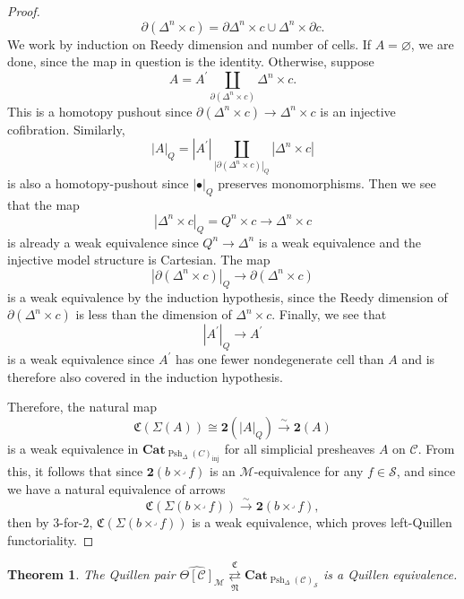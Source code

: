 \documentclass[leqno]{article}
\numberwithin{equation}{subsection}
\theoremstyle{plain}   %
\newtheorem{thm}[equation]{Theorem}
\theoremstyle{remark}
\theoremstyle{plain}
\DeclareMathOperator{\Psh}{Psh}
\newcommand{\Cat}{\ensuremath{\mathbf{Cat}}}
\newcommand{\realiz}[1]{\ensuremath{\left\lvert#1\right\rvert}}
\providecommand{\C}{}
\renewcommand{\C}{\ensuremath{\mathcal{C}}}
\newcommand{\M}{\ensuremath{\mathcal{M}}}
\newcommand{\setS}{\ensuremath{\mathscr{S}}}
\newcommand{\cellset}{\ensuremath{\widehat{\Theta[\mathcal{C}]}}}
\begin{document}
\begin{proof}
  \[\partial(\Delta^n\times c)=\partial\Delta^n \times c \cup \Delta^n \times \partial c.\]
  We work by induction on Reedy dimension and number of cells.
  If \(A=\varnothing\), we are done, since the map in question is the identity.
  Otherwise, suppose
  \[A=A^\prime \coprod_{\partial(\Delta^n\times c)}  \Delta^n\times c.\]
  This is a homotopy pushout since \(\partial(\Delta^n \times c) \to \Delta^n\times c\) is an injective cofibration. Similarly, 
  \[\realiz{A}_Q=\realiz{A^\prime} \coprod_{\realiz{\partial(\Delta^n\times c)}_Q}  \realiz{\Delta^n\times c}\]
  is also a homotopy-pushout since \(\realiz{\bullet}_Q\) preserves monomorphisms.  Then we see that the map 
  \[\realiz{\Delta^n \times c}_Q=Q^n \times c \to \Delta^n\times c\] is already a weak equivalence since \(Q^n\to \Delta^n\) is a weak equivalence and the injective model structure is Cartesian.  The map 
  \[\realiz{\partial(\Delta^n \times c)}_Q \to \partial(\Delta^n \times c)\]
  is a weak equivalence by the induction hypothesis, since the Reedy dimension of \(\partial(\Delta^n \times c)\) is less than the dimension of \(\Delta^n \times c\). Finally, we see that 
  \[\realiz{A^\prime}_Q \to A^\prime\]
  is a weak equivalence since \(A^\prime\) has one fewer nondegenerate cell than \(A\) and is therefore also covered in the induction hypothesis.

  Therefore, the natural map
  \[\mathfrak{C}(\Sigma(A))\cong \mathbf{2}(\realiz{A}_Q) \xrightarrow{\sim} \mathbf{2}(A)\]
  is a weak equivalence in \(\Cat_{\Psh_{\Delta}(C)_{\mathrm{inj}}}\) for all simplicial presheaves \(A\) on \(\C\).
  From this, it follows that since \(\mathbf{2}(b\times^\lrcorner f)\) is an \(\M\)-equivalence for any \(f\in \setS\), and since we have a natural equivalence of arrows \[\mathfrak{C}(\Sigma(b\times^\lrcorner f))\xrightarrow{\sim} \mathbf{2}(b\times^\lrcorner f),\] then by \(3\)-for-\(2\), \(\mathfrak{C}(\Sigma(b\times^\lrcorner f))\) is a weak equivalence, which proves left-Quillen functoriality.
\end{proof}
\begin{thm}\label{maintheorem2}
  The Quillen pair \(\cellset_\M \underset{\mathfrak{N}}{\overset{\mathfrak{C}}{\rightleftarrows}} \Cat_{\Psh_{\Delta}(\C)_{\setS}}\) is a Quillen equivalence.
\end{thm}
\end{document}
